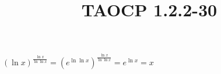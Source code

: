 \documentclass{article}
\title{TAOCP 1.2.2\mbox{-}30}
\begin{document}
\maketitle

\( {(\ln x)}^{\frac{\ln x}{\ln{\ln{x}}}} = {(e^{\ln\ln{x}})}^{\frac{\ln x}{\ln{\ln{x}}}} = e^{\ln{x}} = x \)
\end{document}
